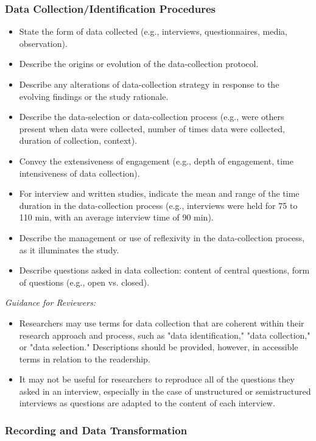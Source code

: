 \documentclass[acmsmall]{acmart}
\begin{document}
\subsubsection{Data Collection/Identification Procedures}
\begin{itemize}
    \item State the form of data collected (e.g., interviews, questionnaires, media, observation).
\item  Describe the origins or evolution of the data-collection protocol.
\item  Describe any alterations of data-collection strategy in response to the evolving findings
or the study rationale.
\item  Describe the data-selection or data-collection process (e.g., were others present when data
were collected, number of times data were collected, duration of collection, context).
\item  Convey the extensiveness of engagement (e.g., depth of engagement, time intensiveness
of data collection).
\item  For interview and written studies, indicate the mean and range of the time duration in
the data-collection process (e.g., interviews were held for 75 to 110 min, with an average
interview time of 90 min).
\item  Describe the management or use of reflexivity in the data-collection process, as it
illuminates the study.
\item  Describe questions asked in data collection: content of central questions, form of questions
(e.g., open vs. closed).
\end{itemize}

\textit{Guidance for Reviewers:}

\begin{itemize}
    \item Researchers may use terms for data collection that are coherent within their research approach and process, such as "data identification," "data collection," or "data selection." Descriptions should be provided, however, in accessible terms in relation to the readership.
    \item  It may not be useful for researchers to reproduce all of the questions they asked in an interview, especially in the case of unstructured or semistructured interviews as questions are adapted to the content of each interview.
\end{itemize}

\subsubsection{Recording and Data Transformation}
\end{document}
